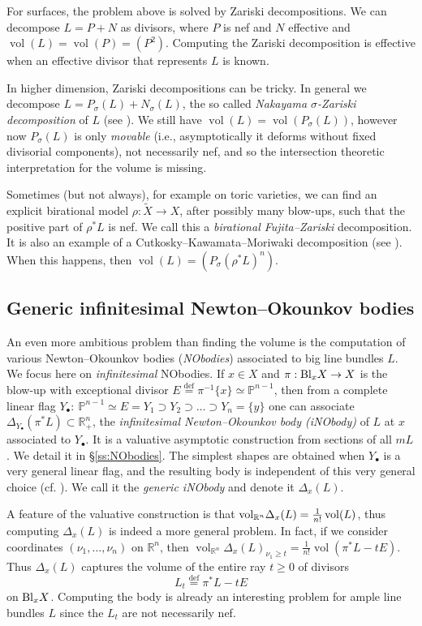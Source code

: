 \documentclass[12pt]{amsart}
\theoremstyle{definition}
\newcommand{\bb}{\ensuremath{\mathfrak{b}}}
\renewcommand{\geq}{\geqslant}
\DeclareMathOperator{\vol}{vol}
\newcommand{\deq}{\ensuremath{\stackrel{\textrm{def}}{=}}}
\newcommand{\nob}[2]{\ensuremath{\Delta_{#1}(#2)}}
\newcommand{\inob}[2]{\ensuremath{{\Delta}_{#1}(#2)}}
\newcommand{\?}{ \circled{{\large\bf ?}}}
\let\bb\mathbb
\begin{document}
For surfaces, the problem above is solved by Zariski decompositions. We can decompose $L=P+N$ as divisors, where $P$ is nef and $N$ effective and $\vol(L)=\vol(P)=(P^2)$. Computing the Zariski decomposition is effective when an effective divisor that represents $L$ is known.

In higher dimension, Zariski decompositions can be tricky. In general we decompose $L=P_{\sigma}(L)+N_{\sigma}(L)$, the so called \emph{Nakayama $\sigma$-Zariski decomposition} of $L$ (see \cite{Nak04}). We still have $\vol(L)=\vol(P_{\sigma}(L))$, however now $P_{\sigma}(L)$ is only \emph{movable} (i.e., asymptotically it deforms without fixed divisorial components), not necessarily nef, and so the intersection theoretic interpretation for the volume is missing.

Sometimes (but not always), for example on toric varieties, we can find an explicit birational model $\rho:\widetilde X\to X$, after possibly many blow-ups, such that the positive part of $\rho^*L$ is nef. We call this a \emph{birational Fujita--Zariski} decomposition. It is also an example of a Cutkosky--Kawamata--Moriwaki decomposition (see \cite{Pro03,KM13}). When this happens, then $\vol(L)=(P_{\sigma}(\rho^*L)^n)$.

\subsection{Generic infinitesimal Newton--Okounkov bodies}
An even more ambitious problem than finding the volume is the computation of various Newton--Okounkov bodies (\emph{NObodies}) associated to big line bundles $L$. We focus here on \emph{infinitesimal} NObodies.  If $x\in X$ and $\pi:{\rm Bl}_xX\to X$ is the blow-up with exceptional divisor $E\deq \pi^{-1}\{x\}\simeq\bb P^{n-1}$, then from a complete linear flag $Y_{\bullet}:\ \bb P^{n-1}\simeq E=Y_1\supset Y_2\supset\ldots\supset Y_n=\{y\}$ one can associate $\nob{Y_{\bullet}}{\pi^*L}\subset\bb R^n_+$, the \emph{infinitesimal Newton--Okounkov body (iNObody)} of $L$ at $x$ associated to $Y_{\bullet}$. It is a valuative asymptotic construction from sections of all $mL$. We detail it in \S\ref{ss:NObodies}. 
The simplest shapes are obtained when $Y_{\bullet}$ is a very general linear flag, and the resulting body is independent of this very general choice (cf. \cite{LM09}). We call it the \emph{generic iNObody} and denote it $\nob{x}{L}$.

A feature of the valuative construction is that ${\rm vol}_{\bb R^n}\nob{x}{L}=\frac 1{n!}\vol(L)$, thus computing $\nob{x}{L}$ is indeed a more general problem. In fact, if we consider coordinates $(\nu_1,\ldots,\nu_n)$ on $\bb R^n$, then $\vol_{\bb R^n}\inob{x}{L}_{\nu_1\geq t}=\frac 1{n!}\vol(\pi^*L-tE)$. Thus $\inob{x}{L}$ captures the volume of the entire ray $t\geq 0$ of divisors
\[L_t\deq \pi^*L-tE\]
on ${\rm Bl}_xX$. Computing the body is already an interesting problem for ample line bundles $L$ since the $L_t$ are not necessarily nef.
\end{document}
